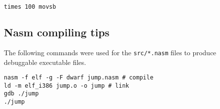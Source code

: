 \documentclass[a4paper]{article}
\begin{document}
\begin{verbatim}
times 100 movsb
\end{verbatim}


\subsection{Nasm compiling tips}

The following commands were used for the \texttt{src/*.nasm} files to produce debuggable executable files.
\begin{verbatim}
nasm -f elf -g -F dwarf jump.nasm # compile
ld -m elf_i386 jump.o -o jump # link
gdb ./jump
./jump
\end{verbatim}



\newpage
\printbibliography
\end{document}
